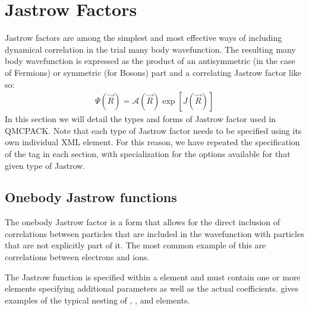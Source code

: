\documentclass[letterpaper,10pt,english]{sphinxmanual}
\begin{document}
\section{Jastrow Factors}
\label{\detokenize{intro_wavefunction:jastrow-factors}}\label{\detokenize{intro_wavefunction:jastrow}}
Jastrow factors are among the simplest and most effective ways of including
dynamical correlation in the trial many body wavefunction.  The resulting many body
wavefunction is expressed as the product of an antisymmetric (in the case
of Fermions) or symmetric (for Bosons) part and a correlating Jastrow factor
like so:
\begin{equation}\label{equation:intro_wavefunction:eq8}
\begin{split}\Psi(\vec{R}) = \mathcal{A}(\vec{R}) \exp\left[J(\vec{R})\right]\end{split}
\end{equation}
In this section we will detail the types and forms of Jastrow factor used
in QMCPACK.  Note that each type of Jastrow factor needs to be specified using
its own individual  XML element.  For this reason, we have repeated the
specification of the  tag in each section, with specialization for the
options available for that given type of Jastrow.


\subsection{One\sphinxhyphen{}body Jastrow functions}
\label{\detokenize{intro_wavefunction:one-body-jastrow-functions}}\label{\detokenize{intro_wavefunction:onebodyjastrow}}
The one\sphinxhyphen{}body Jastrow factor is a form that allows for the direct inclusion
of correlations between particles that are included in the wavefunction with
particles that are not explicitly part of it.  The most common example of
this are correlations between electrons and ions.

The Jastrow function is specified within a  element
and must contain one or more  elements specifying
additional parameters as well as the actual coefficients.
{\hyperref[\detokenize{intro_wavefunction:bjsplineexamples}]{}} gives examples of the typical nesting of
, , and  elements.
\end{document}
